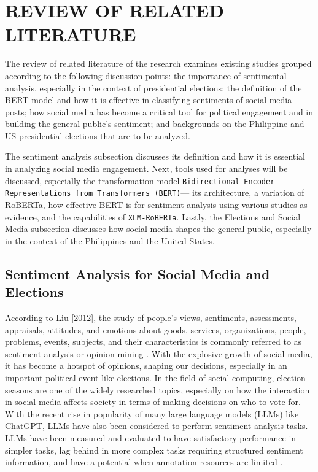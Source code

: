 \chapter{REVIEW OF RELATED LITERATURE}
The review of related literature of the research examines existing studies grouped according to the following discussion points: the importance of sentimental analysis, especially in the context of presidential elections; the definition of the BERT model and how it is effective in classifying sentiments of social media posts; how social media has become a critical tool for political engagement and in building the general public’s sentiment; and backgrounds on the Philippine and US presidential elections that are to be analyzed.

The sentiment analysis subsection discusses its definition and how it is essential in analyzing social media engagement. Next, tools used for analyses will be discussed, especially the transformation model \texttt{Bidirectional Encoder Representations from Transformers (BERT)}— its architecture, a variation of\\RoBERTa, how effective BERT is for sentiment analysis using various studies as evidence, and the capabilities of \texttt{XLM-RoBERTa}. Lastly, the Elections and Social Media subsection discusses how social media shapes the general public, especially in the context of the Philippines and the United States.

\section{Sentiment Analysis for Social Media and Elections}
According to Liu [2012], the study of people's views, sentiments, assessments, appraisals, attitudes, and emotions about goods, services, organizations, people, problems, events, subjects, and their characteristics is commonly referred to as sentiment analysis or opinion mining \cite{RRL_Liu-2012}. With the explosive growth of social media, it has become a hotspot of opinions, shaping our decisions, especially in an important political event like elections. In the field of social computing, election seasons are one of the widely researched topics, especially on how the interaction in social media affects society in terms of making decisions on who to vote for. With the recent rise in popularity of many large language models (LLMs) like ChatGPT, LLMs have also been considered to perform sentiment analysis tasks. LLMs have been measured and evaluated to have satisfactory performance in simpler tasks, lag behind in more complex tasks requiring structured sentiment information, and have a potential when annotation resources are limited \cite{RRL_Liu-2023}.

